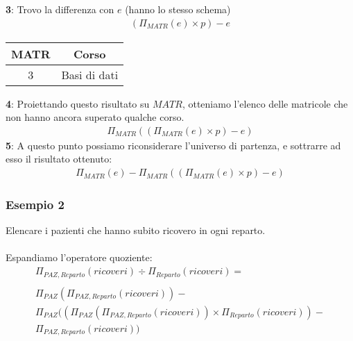 \textbf{3}: Trovo la differenza con $e$ (hanno lo stesso schema)
    \begin{equation}\begin{aligned}
        (\Pi_{MATR}(e) \times p) - e
    \end{aligned}\end{equation}
    \begin{center}\begin{tabular}{|c|c|} \hline
        \textbf{MATR} & \textbf{Corso} \\ \hline
        3 & Basi di dati \\ \hline
    \end{tabular}\end{center}
\textbf{4}: Proiettando questo risultato su $MATR$, otteniamo l'elenco delle matricole che non hanno ancora superato qualche corso.
    \begin{equation}\begin{aligned}
        \Pi_{MATR}((\Pi_{MATR}(e) \times p) - e)
    \end{aligned}\end{equation}
\textbf{5}: A questo punto possiamo riconsiderare l'universo di partenza, e sottrarre ad esso il risultato ottenuto: 
    \begin{equation}\begin{aligned}
        \Pi_{MATR}(e) - \Pi_{MATR}((\Pi_{MATR}(e) \times p) - e)
    \end{aligned}\end{equation}
    
\subsubsection{Esempio 2}
Elencare i pazienti che hanno subito ricovero in ogni reparto.\\\\
Espandiamo l'operatore quoziente:
    \begin{equation}\begin{aligned}
        \Pi_{PAZ, Reparto}(ricoveri) \div \Pi_{Reparto}(ricoveri) = \\\\
        \Pi_{PAZ}(\Pi_{PAZ, Reparto}(ricoveri)) -\\
        \Pi_{PAZ}((\Pi_{PAZ}(\Pi_{PAZ, Reparto}(ricoveri)) 
        \times \Pi_{Reparto}(ricoveri)) - \\
        \Pi_{PAZ, Reparto}(ricoveri))
    \end{aligned}\end{equation}

